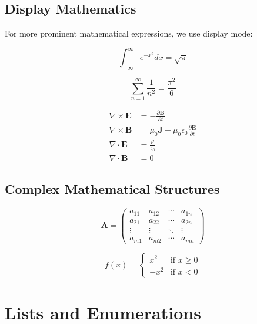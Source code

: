 \documentclass[11pt,letterpaper]{article}
\begin{document}
\subsection{Display Mathematics}

For more prominent mathematical expressions, we use display mode:

\begin{equation}
\int_{-\infty}^{\infty} e^{-x^2} dx = \sqrt{\pi}
\end{equation}

\begin{equation}
\sum_{n=1}^{\infty} \frac{1}{n^2} = \frac{\pi^2}{6}
\end{equation}

\begin{align}
\nabla \times \mathbf{E} &= -\frac{\partial \mathbf{B}}{\partial t} \\
\nabla \times \mathbf{B} &= \mu_0\mathbf{J} + \mu_0\epsilon_0\frac{\partial \mathbf{E}}{\partial t} \\
\nabla \cdot \mathbf{E} &= \frac{\rho}{\epsilon_0} \\
\nabla \cdot \mathbf{B} &= 0
\end{align}

\subsection{Complex Mathematical Structures}

\begin{equation}
\mathbf{A} = \begin{pmatrix}
a_{11} & a_{12} & \cdots & a_{1n} \\
a_{21} & a_{22} & \cdots & a_{2n} \\
\vdots & \vdots & \ddots & \vdots \\
a_{m1} & a_{m2} & \cdots & a_{mn}
\end{pmatrix}
\end{equation}

\begin{equation}
f(x) = \begin{cases}
x^2 & \text{if } x \geq 0 \\
-x^2 & \text{if } x < 0
\end{cases}
\end{equation}

\section{Lists and Enumerations}
\end{document}
